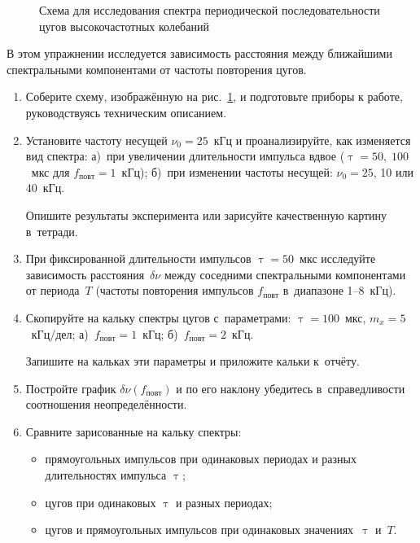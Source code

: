 \begin{figure}
	\hfill
	\hspace*{\fill}
	\label{fig:613}
	\caption{Схема для исследования спектра периодической последовательности цугов высокочастотных колебаний}
\end{figure}

\begin{lab:task}

В этом упражнении исследуется зависимость расстояния между ближайшими спектральными компонентами от частоты повторения цугов.

\begin{enumerate}
	\item Соберите схему, изображённую на рис.~\ref{fig:613}, и подготовьте приборы к работе, руководствуясь техническим описанием.
	\item Установите частоту несущей $\nu_0=25$~кГц и проанализируйте, как изменяется вид спектра: а)~при увеличении длительности импульса вдвое ($\uptau=50,\;100$~мкс для $f_{повт}=1$~кГц); б)~при изменении частоты несущей: $\nu_0=25$, 10 или 40~кГц.
	
	Опишите результаты эксперимента или зарисуйте качественную картину в~тетради.
	\item При фиксированной длительности импульсов $\uptau=50$~мкс исследуйте зависимость расстояния~$\delta \nu$ между соседними спектральными компонентами от периода~$T$ (частоты повторения импульсов $f_{повт}$ в~диапазоне 1--8~кГц).
	\item Скопируйте на кальку спектры цугов с~параметрами: $\uptau=100$~мкс, $m_x=5$~кГц/дел; а)~$f_{повт}=1$~кГц; б)~$f_{повт}=2$~кГц.
	
	Запишите на кальках эти параметры и приложите кальки к~отчёту.
	
	\item Постройте график $\delta \nu(f_{повт})$ и по его наклону убедитесь в~справедливости соотношения неопределённости.
	\item Сравните зарисованные на кальку спектры:
	\begin{itemize}
		\item прямоугольных импульсов при одинаковых периодах и разных длительностях импульса $\uptau$;
		\item цугов при одинаковых $\uptau$ и разных периодах;
		\item цугов и прямоугольных импульсов при одинаковых значениях~$\uptau$ и~$T$.
	\end{itemize}
	
\end{enumerate}

\end{lab:task}

